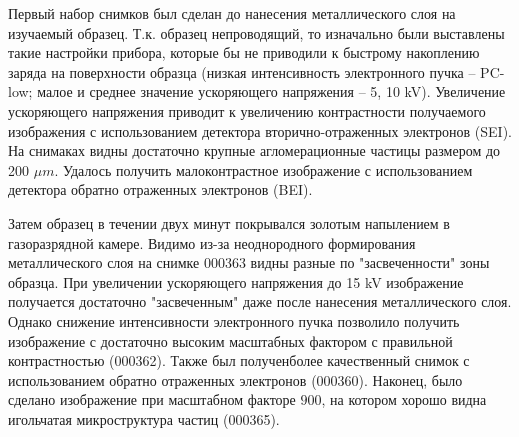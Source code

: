 \documentclass[12pt]{article}
\begin{document}
Первый набор снимков был сделан до нанесения металлического слоя на изучаемый образец. Т.к. образец непроводящий, то изначально были выставлены такие настройки прибора, которые бы не приводили к быстрому накоплению заряда на поверхности образца (низкая интенсивность электронного пучка -- PC-low; малое и среднее значение ускоряющего напряжения -- 5, 10 kV). Увеличение ускоряющего напряжения приводит к увеличению контрастности получаемого изображения с использованием детектора вторично-отраженных электронов (SEI). На снимаках видны достаточно крупные агломерационные частицы размером до 200 $\mu m$. Удалось получить малоконтрастное изображение с использованием детектора обратно отраженных электронов (BEI). \par
Затем образец в течении двух минут покрывался золотым напылением в газоразрядной камере. Видимо из-за неоднородного формирования металлического слоя на снимке 000363 видны разные по "засвеченности" зоны образца. При увеличении ускоряющего напряжения до 15 kV изображение получается достаточно "засвеченным" даже после нанесения металлического слоя. Однако снижение интенсивности электронного пучка позволило получить изображение с достаточно высоким масштабных фактором с правильной контрастностью (000362). Также был полученболее качественный снимок с использованием обратно отраженных электронов (000360). Наконец, было сделано изображение при масштабном факторе $900$, на котором хорошо видна игольчатая микроструктура частиц (000365). 
\end{document}
